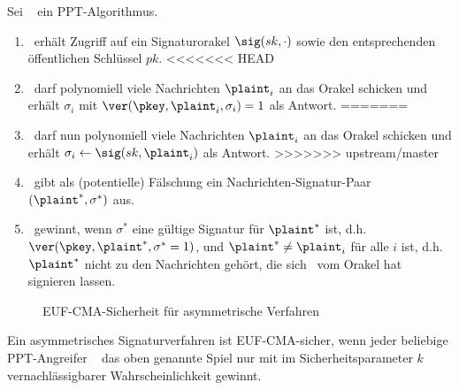 \begin{definition}
Sei \A~ ein PPT-Algorithmus.
\begin{enumerate}
\item \A~erhält Zugriff auf ein Signaturorakel $\sig(sk, \cdot)$ sowie den
  entsprechenden öffentlichen Schlüssel $pk$.
<<<<<<< HEAD
\item \A~darf polynomiell viele Nachrichten $\plaint_i$ an das
  Orakel schicken und erhält $\sigma_i$ mit $\ver(\pkey, \plaint_i, \sigma_i)=1$ als Antwort.
=======
\item \A~darf nun polynomiell viele Nachrichten $\plaint_i$ an das
  Orakel schicken und erhält $\sigma_i \leftarrow \sig(sk, \plaint_i)$ als Antwort.
>>>>>>> upstream/master
\item \A~gibt als (potentielle) Fälschung ein Nachrichten-Signatur-Paar
  $(\plaint^*,\sigma^*)$ aus.
\item \A~gewinnt, wenn $\sigma^*$ eine gültige Signatur für
  $\plaint^*$ ist, d.h. $\ver(\pkey, \plaint^*, \sigma^* = 1)$, und $\plaint^*
  \neq \plaint_i$ für alle $i$ ist, d.h. $\plaint^*$ nicht zu den
  Nachrichten gehört, die sich \A~vom Orakel hat signieren lassen.
\end{enumerate} 

\begin{figure}
\begin{center}
  \caption{EUF-CMA-Sicherheit für asymmetrische Verfahren}
  \label{abb:euf-cma-asym}
\end{center}
\end{figure}

Ein asymmetrisches Signaturverfahren ist EUF-CMA-sicher, wenn jeder
beliebige PPT-Angreifer \A~ das oben genannte Spiel nur mit im
Sicherheitsparameter $k$ vernachlässigbarer Wahrscheinlichkeit gewinnt. 
\end{definition}

